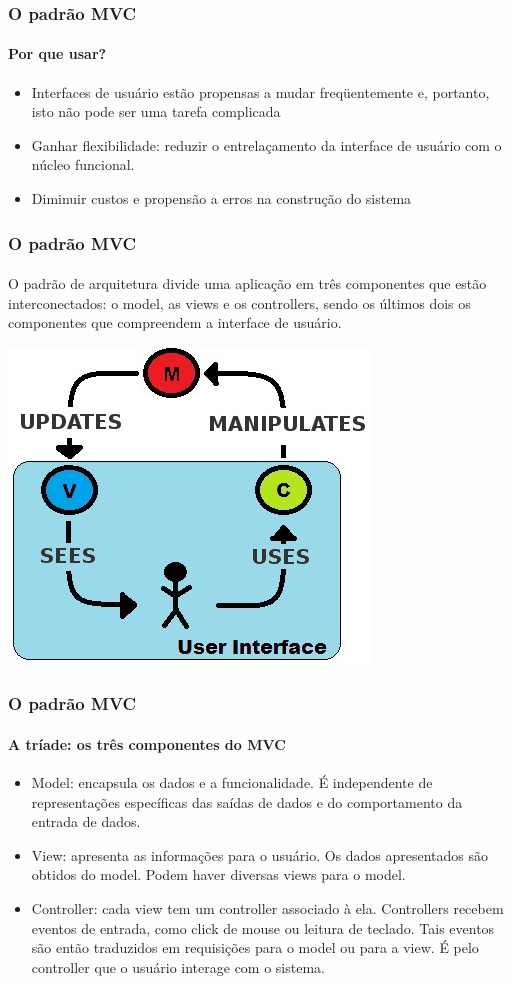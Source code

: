 \documentclass{beamer}
\begin{document}
\begin{frame}
\frametitle{O padrão MVC}
\framesubtitle{Por que usar?}
\begin{itemize}
	\item Interfaces de usuário estão propensas a mudar freqüentemente e, portanto, isto não pode ser uma tarefa complicada
	\item Ganhar flexibilidade: reduzir o entrelaçamento da interface de usuário com o núcleo funcional.
	\item Diminuir custos e propensão a erros na construção do sistema
\end{itemize}
\end{frame}

\begin{frame}
\frametitle{O padrão MVC}
\framesubtitle{}
	O padrão de arquitetura divide uma aplicação em três componentes que estão interconectados: o model, as views e os controllers, sendo os últimos dois os componentes que compreendem a interface de usuário.
\begin{center}
	\includegraphics[scale=0.4]{MVC.jpg}
\end{center}
\end{frame}

\begin{frame}
\frametitle{O padrão MVC}
\framesubtitle{A tríade: os três componentes do MVC}
\begin{itemize}
	\item Model: encapsula os dados e a funcionalidade. É independente de representações específicas das saídas de dados e do comportamento da entrada de dados.
	\item View: apresenta as informações para o usuário. Os dados apresentados são obtidos do model. Podem haver diversas views para o model.
	\item Controller: cada view tem um controller associado à ela. Controllers recebem eventos de entrada, como click de mouse ou leitura de teclado. Tais eventos são então traduzidos em requisições para o model ou para a view. É pelo controller que o usuário interage com o sistema.
\end{itemize}
\end{frame}
\end{document}
